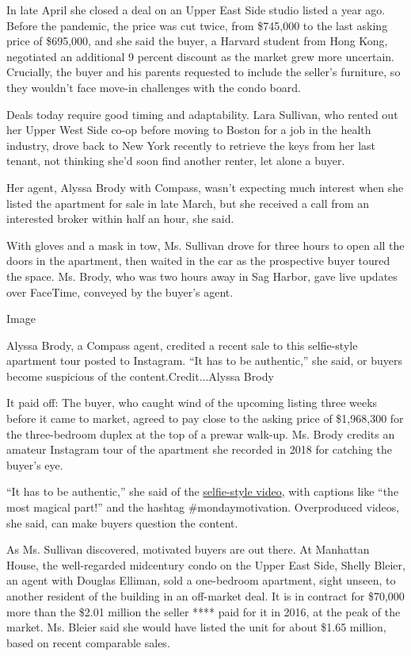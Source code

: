 In late April she closed a deal on an Upper East Side studio listed a
year ago. Before the pandemic, the price was cut twice, from \$745,000
to the last asking price of \$695,000, and she said the buyer, a Harvard
student from Hong Kong, negotiated an additional 9 percent discount as
the market grew more uncertain. Crucially, the buyer and his parents
requested to include the seller's furniture, so they wouldn't face
move-in challenges with the condo board.

Deals today require good timing and adaptability. Lara Sullivan, who
rented out her Upper West Side co-op before moving to Boston for a job
in the health industry, drove back to New York recently to retrieve the
keys from her last tenant, not thinking she'd soon find another renter,
let alone a buyer.

Her agent, Alyssa Brody with Compass, wasn't expecting much interest
when she listed the apartment for sale in late March, but she received a
call from an interested broker within half an hour, she said.

With gloves and a mask in tow, Ms. Sullivan drove for three hours to
open all the doors in the apartment, then waited in the car as the
prospective buyer toured the space. Ms. Brody, who was two hours away in
Sag Harbor, gave live updates over FaceTime, conveyed by the buyer's
agent.

Image

Alyssa Brody, a Compass agent, credited a recent sale to this
selfie-style apartment tour posted to Instagram. ``It has to be
authentic,'' she said, or buyers become suspicious of the
content.Credit...Alyssa Brody

It paid off: The buyer, who caught wind of the upcoming listing three
weeks before it came to market, agreed to pay close to the asking price
of \$1,968,300 for the three-bedroom duplex at the top of a prewar
walk-up. Ms. Brody credits an amateur Instagram tour of the apartment
she recorded in 2018 for catching the buyer's eye.

``It has to be authentic,'' she said of the
\href{https://www.instagram.com/p/B_FmVj1jMkC/}{selfie-style video},
with captions like ``the most magical part!'' and the hashtag
\#mondaymotivation. Overproduced videos, she said, can make buyers
question the content.

As Ms. Sullivan discovered, motivated buyers are out there. At Manhattan
House, the well-regarded midcentury condo on the Upper East Side, Shelly
Bleier, an agent with Douglas Elliman, sold a one-bedroom apartment,
sight unseen, to another resident of the building in an off-market deal.
It is in contract for \$70,000 more than the \$2.01 million the seller
**** paid for it in 2016, at the peak of the market. Ms. Bleier said she
would have listed the unit for about \$1.65 million, based on recent
comparable sales.


